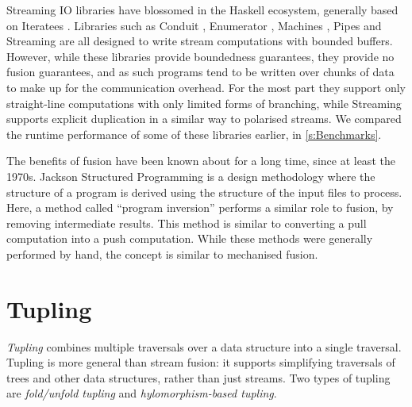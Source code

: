 
Streaming IO libraries have blossomed in the Haskell ecosystem, generally based on Iteratees \cite{kiselyov2012iteratees}.
Libraries such as Conduit \cite{hackage:conduit}, Enumerator \cite{hackage:enumerator}, Machines \cite{hackage:machines}, Pipes \cite{hackage:pipes} and Streaming \cite{hackage:streaming} are all designed to write stream computations with bounded buffers.
However, while these libraries provide boundedness guarantees, they provide no fusion guarantees, and as such programs tend to be written over chunks of data to make up for the communication overhead.
For the most part they support only straight-line computations with only limited forms of branching, while Streaming supports explicit duplication in a similar way to polarised streams.
We compared the runtime performance of some of these libraries earlier, in \cref{s:Benchmarks}.

The benefits of fusion have been known about for a long time, since at least the 1970s.
Jackson Structured Programming \citep{jackson2002jsp} is a design methodology where the structure of a program is derived using the structure of the input files to process.
Here, a method called ``program inversion'' performs a similar role to fusion, by removing intermediate results.
This method is similar to converting a pull computation into a push computation.
While these methods were generally performed by hand, the concept is similar to mechanised fusion.

\section{Tupling}
\label{related/tupling}

\emph{Tupling} combines multiple traversals over a data structure into a single traversal.
Tupling is more general than stream fusion: it supports simplifying traversals of trees and other data structures, rather than just streams.
Two types of tupling are \emph{fold/unfold tupling} and \emph{hylomorphism-based tupling}.

